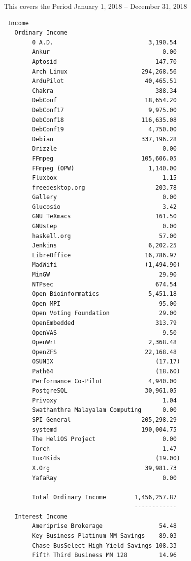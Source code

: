 \documentclass[a4paper]{report}
\begin{document}
This covers the Period January 1, 2018 -- December 31, 2018

\begin{verbatim}
 Income
   Ordinary Income
        0 A.D.                           3,190.54
        Ankur                                0.00
        Aptosid                            147.70
        Arch Linux                     294,268.56
        ArduPilot                       40,465.51
        Chakra                             388.34
        DebConf                         18,654.20
        DebConf17                        9,975.00
        DebConf18                      116,635.08
        DebConf19                        4,750.00
        Debian                         337,196.28
        Drizzle                              0.00
        FFmpeg                         105,606.05
        FFmpeg (OPW)                     1,140.00
        Fluxbox                              1.15
        freedesktop.org                    203.78
        Gallery                              0.00
        Glucosio                             3.42
        GNU TeXmacs                        161.50
        GNUstep                              0.00
        haskell.org                         57.00
        Jenkins                          6,202.25
        LibreOffice                     16,786.97
        MadWifi                         (1,494.90)
        MinGW                               29.90
        NTPsec                             674.54
        Open Bioinformatics              5,451.18
        Open MPI                            95.00
        Open Voting Foundation              29.00
        OpenEmbedded                       313.79
        OpenVAS                              9.50
        OpenWrt                          2,368.48
        OpenZFS                         22,168.48
        OSUNIX                             (17.17)
        Path64                             (18.60)
        Performance Co-Pilot             4,940.00
        PostgreSQL                      30,961.05
        Privoxy                              1.04
        Swathanthra Malayalam Computing      0.00
        SPI General                    205,298.29
        systemd                        190,004.75
        The HeliOS Project                   0.00
        Torch                                1.47
        Tux4Kids                           (19.00)
        X.Org                           39,981.73
        YafaRay                              0.00

        Total Ordinary Income        1,456,257.87
                                     ------------
   Interest Income
        Ameriprise Brokerage                54.48
        Key Business Platinum MM Savings    89.03
        Chase BusSelect High Yield Savings 108.33
        Fifth Third Business MM 128         14.96


\end{verbatim}
\end{document}
